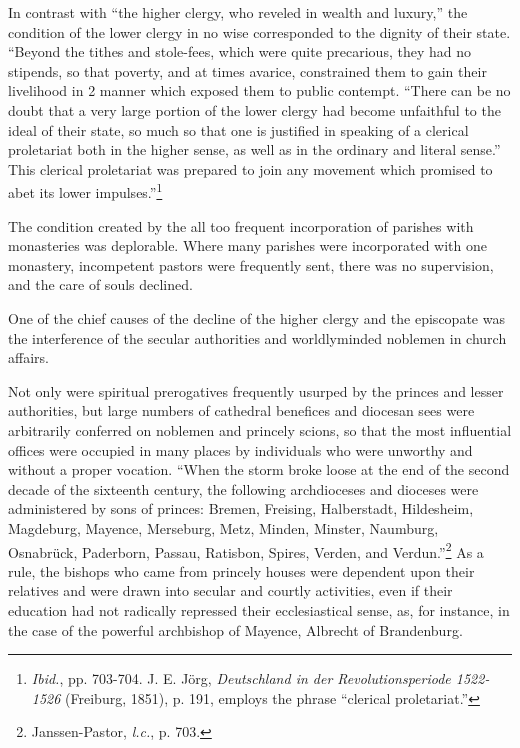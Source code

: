 In contrast with “the higher clergy, who reveled in wealth and
luxury,” the condition of the lower clergy in no wise corresponded to
the dignity of their state. “Beyond the tithes and stole-fees, which
were quite precarious, they had no stipends, so that poverty, and at
times avarice, constrained them to gain their livelihood in 2 manner
which exposed them to public contempt. “There can be no doubt that
a very large portion of the lower clergy had become unfaithful to
the ideal of their state, so much so that one is justified in speaking of
a clerical proletariat both in the higher sense, as well as in the ordinary
and literal sense.” This clerical proletariat was prepared to join
any movement which promised to abet its lower impulses.”\footnote
{\textit{Ibid.}, pp. 703-704. J. E. Jörg, \textit{Deutschland in der Revolutionsperiode 1522-1526} (Freiburg,
1851), p. 191, employs the phrase “clerical proletariat.”}

The condition created by the all too frequent incorporation of
parishes with monasteries was deplorable. Where many parishes were
incorporated with one monastery, incompetent pastors were frequently
sent, there was no supervision, and the care of souls declined.


One of the chief causes of the decline of the higher clergy and the
episcopate was the interference of the secular authorities and worldlyminded
noblemen in church affairs.

Not only were spiritual prerogatives frequently usurped by the
princes and lesser authorities, but large numbers of cathedral benefices
and diocesan sees were arbitrarily conferred on noblemen and princely
scions, so that the most influential offices were occupied in many
places by individuals who were unworthy and without a proper vocation.
“When the storm broke loose at the end of the second decade of
the sixteenth century, the following archdioceses and dioceses were
administered by sons of princes: Bremen, Freising, Halberstadt, Hildesheim,
Magdeburg, Mayence, Merseburg, Metz, Minden, Minster,
Naumburg, Osnabrück, Paderborn, Passau, Ratisbon, Spires, Verden,
and Verdun.”\footnote{Janssen-Pastor, \textit{l.c.}, p. 703.}
As a rule, the bishops who came from princely houses
were dependent upon their relatives and were drawn into secular and
courtly activities, even if their education had not radically repressed
their ecclesiastical sense, as, for instance, in the case of the powerful
archbishop of Mayence, Albrecht of Brandenburg.

